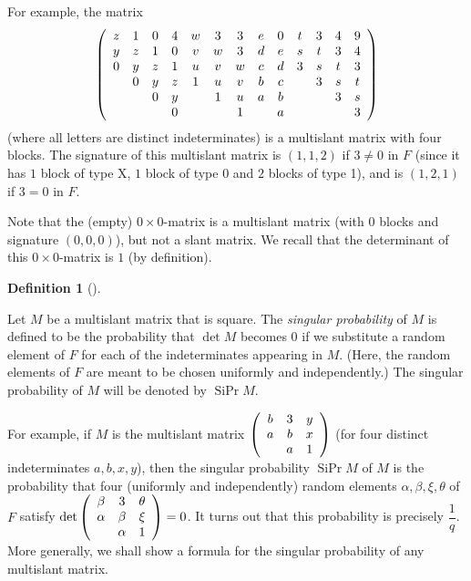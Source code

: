 \documentclass[numbers=enddot,12pt,final,onecolumn,notitlepage]{scrartcl}%
\theoremstyle{definition}
\newtheorem{defi}[theo]{Definition}
\newenvironment{definition}[1][]
{\begin{defi}[#1]\begin{leftbar}}
{\end{leftbar}\end{defi}}
\theoremstyle{plainsl}
\begin{document}
For example, the matrix%
\[
\left(
\begin{array}
[c]{ccccccccccccc}%
z & 1 & 0 & 4 & w & 3 & 3 & e & 0 & t & 3 & 4 & 9\\
y & z & 1 & 0 & v & w & 3 & d & e & s & t & 3 & 4\\
0 & y & z & 1 & u & v & w & c & d & 3 & s & t & 3\\
& 0 & y & z & 1 & u & v & b & c &  & 3 & s & t\\
&  & 0 & y &  & 1 & u & a & b &  &  & 3 & s\\
&  &  & 0 &  &  & 1 &  & a &  &  &  & 3
\end{array}
\right)
\]
(where all letters are distinct indeterminates) is a multislant matrix with
four blocks. The signature of this multislant matrix is $\left(  1,1,2\right)
$ if $3\neq0$ in $F$ (since it has $1$ block of type X, $1$ block of type 0
and $2$ blocks of type 1), and is $\left(  1,2,1\right)  $ if $3=0$ in $F$.

Note that the (empty) $0\times0$-matrix is a multislant matrix (with $0$
blocks and signature $\left(  0,0,0\right)  $), but not a slant matrix. We
recall that the determinant of this $0\times0$-matrix is $1$ (by definition).

\begin{definition}
\label{def.SiPr}Let $M$ be a multislant matrix that is square. The
\emph{singular probability} of $M$ is defined to be the probability that $\det
M$ becomes $0$ if we substitute a random element of $F$ for each of the
indeterminates appearing in $M$. (Here, the random elements of $F$ are meant
to be chosen uniformly and independently.) The singular probability of $M$
will be denoted by $\operatorname*{SiPr}M$.
\end{definition}

For example, if $M$ is the multislant matrix $\left(
\begin{array}
[c]{ccc}%
b & 3 & y\\
a & b & x\\
& a & 1
\end{array}
\right)  $ (for four distinct indeterminates $a,b,x,y$), then the singular
probability $\operatorname*{SiPr}M$ of $M$ is the probability that four
(uniformly and independently) random elements $\alpha,\beta,\xi,\theta$ of $F$
satisfy $\det\left(
\begin{array}
[c]{ccc}%
\beta & 3 & \theta\\
\alpha & \beta & \xi\\
& \alpha & 1
\end{array}
\right)  =0$. It turns out that this probability is precisely $\dfrac{1}{q}$.
More generally, we shall show a formula for the singular probability of any
multislant matrix.
\end{document}
